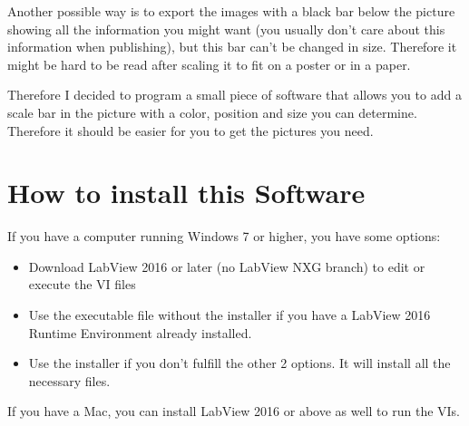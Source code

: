 \documentclass[english]{scrartcl}
\begin{document}
Another possible way is to export the images with a black bar below the picture showing all the information you might want (you usually don't care about this information when publishing), but this bar can't be changed in size. Therefore it might be hard to be read after scaling it to fit on a poster or in a paper.

Therefore I decided to program a small piece of software that allows you to add a scale bar in the picture with a color, position and size you can determine. Therefore it should be easier for you to get the pictures you need.
\section{How to install this Software}
If you have a computer running Windows 7 or higher, you have some options:
\begin{itemize}
	\item Download LabView 2016 or later (no LabView NXG branch) to edit or execute the VI files
	\item Use the executable file without the installer if you have a LabView 2016 Runtime Environment already installed.
	\item Use the installer if you don't fulfill the other 2 options. It will install all the necessary files.
\end{itemize}
If you have a Mac, you can install LabView 2016 or above as well to run the VIs. %
\end{document}
